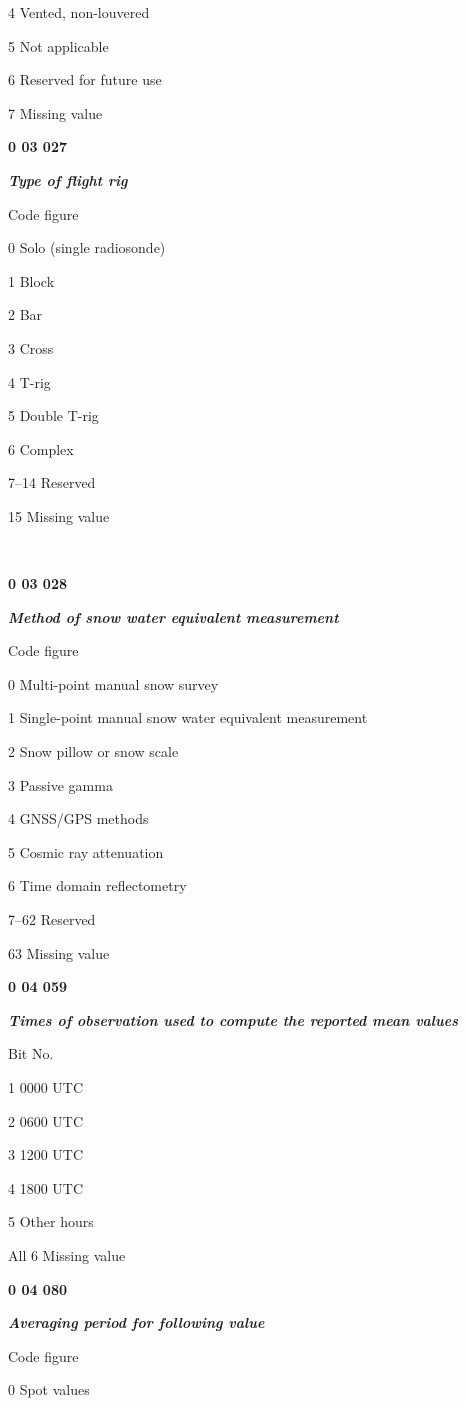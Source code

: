 4 Vented, non-louvered

5 Not applicable

6 Reserved for future use

7 Missing value

\textbf{0 03 027}

\emph{\textbf{Type of flight rig}}

Code figure

0 Solo (single radiosonde)

1 Block

2 Bar

3 Cross

4 T-rig

5 Double T-rig

6 Complex

7--14 Reserved

15 Missing value

\textbf{\\
}

\textbf{0 03 028}

\emph{\textbf{Method of snow water equivalent measurement}}

Code figure

0 Multi-point manual snow survey

1 Single-point manual snow water equivalent measurement

2 Snow pillow or snow scale

3 Passive gamma

4 GNSS/GPS methods

5 Cosmic ray attenuation

6 Time domain reflectometry

7--62 Reserved

63 Missing value

\textbf{0 04 059}

\emph{\textbf{Times of observation used to compute the reported mean values}}

Bit No.

1 0000 UTC

2 0600 UTC

3 1200 UTC

4 1800 UTC

5 Other hours

All 6 Missing value

\textbf{0 04 080}

\emph{\textbf{Averaging period for following value}}

Code figure

0 Spot values

